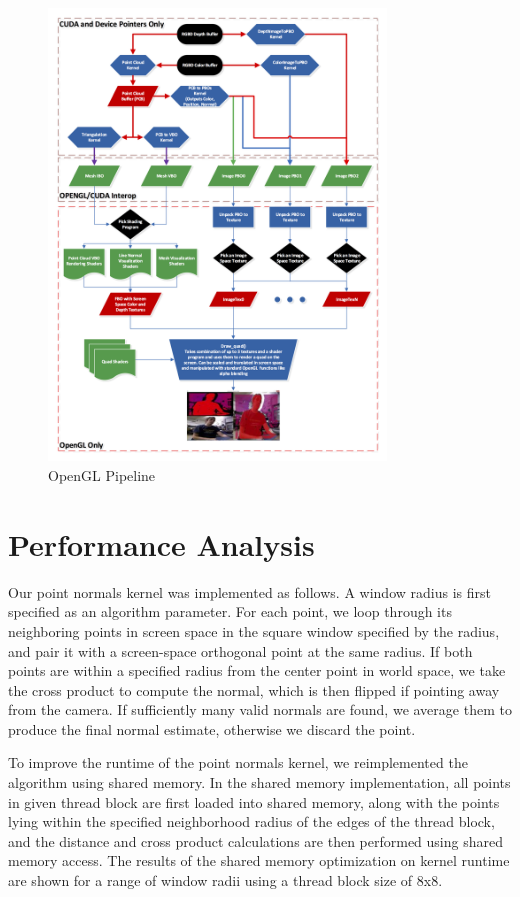 \documentclass{jcgt}
\begin{document}
\begin{figure}[htb]
  \centering
   \includegraphics[width=0.8\textwidth]{../../diagrams/OpenGLPipeline.png}
   \caption{\label{fig:GLPipeline}
        OpenGL Pipeline}
\end{figure}

\section{Performance Analysis}

Our point normals kernel was implemented as follows. A window radius is first specified as an algorithm parameter. For each point, we loop through its neighboring points in screen space in the square window specified by the radius, and pair it with a screen-space orthogonal point at the same radius. If both points are within a specified radius from the center point in world space, we take the cross product to compute the normal, which is then flipped if pointing away from the camera. If sufficiently many valid normals are found, we average them to produce the final normal estimate, otherwise we discard the point.

To improve the runtime of the point normals kernel, we reimplemented the algorithm using shared memory. In the shared memory implementation, all points in given thread block are first loaded into shared memory, along with the points lying within the specified neighborhood radius of the edges of the thread block, and the distance and cross product calculations are then performed using shared memory access. The results of the shared memory optimization on kernel runtime are shown for a range of window radii using a thread block size of 8x8.
\end{document}
